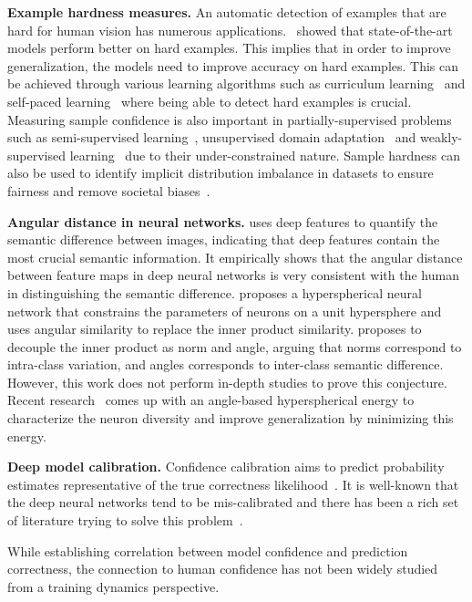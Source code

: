 \textbf{Example hardness measures.} An automatic detection of examples that are hard for human vision has numerous applications.~\citep{recht2019imagenet} showed that state-of-the-art models perform better on hard examples. This implies that in order to improve generalization, the models need to improve accuracy on hard examples. This can be achieved through various learning algorithms such as curriculum learning~\citep{bengio2009curriculum} and self-paced learning~\citep{kumar2010self} where being able to detect hard examples is crucial. Measuring sample confidence is also important in partially-supervised problems such as semi-supervised learning~\citep{zhu2007semi, zhou2012self}, unsupervised domain adaptation~\citep{chen2011co} and weakly-supervised learning~\citep{tang2017multiple} due to their under-constrained nature. Sample hardness can also be used to identify implicit distribution imbalance in datasets to ensure fairness and remove societal biases~\citep{buolamwini2018gender}.

\textbf{Angular distance in neural networks.} \cite{zhang2018unreasonable} uses deep features to quantify the semantic difference between images, indicating that deep features contain the most crucial semantic information. It empirically shows that the angular distance between feature maps in deep neural networks is very consistent with the human in distinguishing the semantic difference. \cite{liu2017deep} proposes a hyperspherical neural network that constrains the parameters of neurons on a unit hypersphere and uses angular similarity to replace the inner product similarity. \cite{liu2018decoupled} proposes to decouple the inner product as norm and angle, arguing that norms correspond to intra-class variation, and angles corresponds to inter-class semantic difference. However, this work does not perform in-depth studies to prove this conjecture. Recent research~\cite{liu2018learning,Lin20CoMHE,liu2020orthogonal} comes up with an angle-based hyperspherical energy to characterize the neuron diversity and improve generalization by minimizing this energy.

\textbf{Deep model calibration.} Confidence calibration aims to predict probability estimates representative of the true correctness likelihood~\cite{guo2017calibration}. It is well-known that the deep neural networks tend to be mis-calibrated and there has been a rich set of literature trying to solve this problem~\cite{kumar2018trainable, guo2017calibration}. 

While establishing correlation between model confidence and prediction correctness, the connection to human confidence has not been widely studied from a training dynamics perspective.

